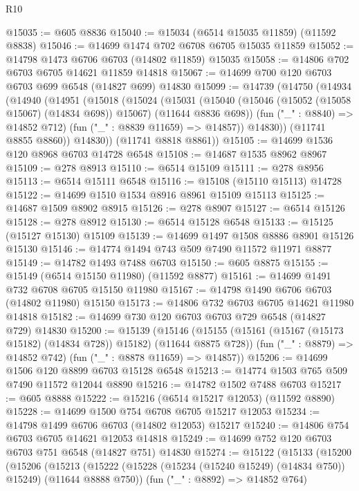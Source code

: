 \begin{lexlean}{R10}
\begin{coremodule}
@15035 := @605 @8836
@15040 := @15034 (@6514 @15035 @11859) (@11592 @8838)
@15046 := @14699 @1474 @702 @6708 @6705 @15035 @11859
@15052 := @14798 @1473 @6706 @6703 (@14802 @11859) @15035
@15058 := @14806 @702 @6703 @6705 @14621 @11859 @14818
@15067 := @14699 @700 @120 @6703 @6703 @699 @6548 (@14827 @699) @14830
@15099 := @14739
    (@14750
      (@14934
        (@14940
          (@14951
            (@15018
              (@15024
                (@15031
                  (@15040
                    (@15046 (@15052 (@15058 @15067) (@14834 @698)) @15067)
                    (@11644 @8836 @698))
                  (fun ("_" : @8840) => @14852 @712)
                  (fun ("_" : @8839 @11659) => @14857))
                @14830))
            (@11741 @8855 @8860))
          @14830))
      (@11741 @8818 @8861))
@15105 := @14699 @1536 @120 @8968 @6703 @14728 @6548
@15108 := @14687 @1535 @8962 @8967
@15109 := @278 @8913
@15110 := @6514 @15109
@15111 := @278 @8956
@15113 := @6514 @15111 @6548
@15116 := @15108 (@15110 @15113) @14728
@15122 := @14699 @1510 @1534 @8916 @8961 @15109 @15113
@15125 := @14687 @1509 @8902 @8915
@15126 := @278 @8907
@15127 := @6514 @15126
@15128 := @278 @8912
@15130 := @6514 @15128 @6548
@15133 := @15125 (@15127 @15130) @15109
@15139 := @14699 @1497 @1508 @8886 @8901 @15126 @15130
@15146 := @14774 @1494 @743 @509 @7490 @11572 @11971 @8877
@15149 := @14782 @1493 @7488 @6703
@15150 := @605 @8875
@15155 := @15149 (@6514 @15150 @11980) (@11592 @8877)
@15161 := @14699 @1491 @732 @6708 @6705 @15150 @11980
@15167 := @14798 @1490 @6706 @6703 (@14802 @11980) @15150
@15173 := @14806 @732 @6703 @6705 @14621 @11980 @14818
@15182 := @14699 @730 @120 @6703 @6703 @729 @6548 (@14827 @729) @14830
@15200 := @15139
    (@15146
      (@15155 (@15161 (@15167 (@15173 @15182) (@14834 @728)) @15182) (@11644 @8875 @728))
      (fun ("_" : @8879) => @14852 @742)
      (fun ("_" : @8878 @11659) => @14857))
@15206 := @14699 @1506 @120 @8899 @6703 @15128 @6548
@15213 := @14774 @1503 @765 @509 @7490 @11572 @12044 @8890
@15216 := @14782 @1502 @7488 @6703
@15217 := @605 @8888
@15222 := @15216 (@6514 @15217 @12053) (@11592 @8890)
@15228 := @14699 @1500 @754 @6708 @6705 @15217 @12053
@15234 := @14798 @1499 @6706 @6703 (@14802 @12053) @15217
@15240 := @14806 @754 @6703 @6705 @14621 @12053 @14818
@15249 := @14699 @752 @120 @6703 @6703 @751 @6548 (@14827 @751) @14830
@15274 := @15122
    (@15133
      (@15200
        (@15206
          (@15213
            (@15222 (@15228 (@15234 (@15240 @15249) (@14834 @750)) @15249) (@11644 @8888 @750))
            (fun ("_" : @8892) => @14852 @764)

\end{coremodule}
\end{lexlean}
